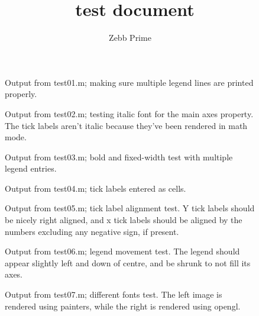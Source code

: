\documentclass[a4paper,11pt]{article}
\title{\matlabfrag\ test document}
\author{Zebb Prime}
\begin{document}
  \maketitle
     \begin{figure}[ht]
       \centering
       \caption{Output from {\ttfamily test01.m}; making sure multiple legend lines are printed properly.}
     \end{figure}
     \begin{figure}[ht]
       \centering
       \caption{Output from {\ttfamily test02.m}; testing italic font for the main axes property. The
       tick labels aren't italic because they've been rendered in math mode.}
     \end{figure}
     \begin{figure}[ht]
       \centering
       \caption{Output from {\ttfamily test03.m}; bold and fixed-width test with multiple legend entries.}
     \end{figure}
     \begin{figure}[ht]
       \centering
       \caption{Output from {\ttfamily test04.m}; tick labels entered as cells.}
     \end{figure}
     \begin{figure}[ht]
       \centering
       \caption{Output from {\ttfamily test05.m}; tick label alignment test. Y tick labels should be
       nicely right aligned, and x tick labels should be aligned by the numbers excluding any negative
       sign, if present.}
%
\clearpage
%
     \end{figure}
     \begin{figure}[ht]
       \centering
       \caption{Output from {\ttfamily test06.m}; legend movement test. The legend should appear slightly
         left and down of centre, and be shrunk to not fill its axes.}
     \end{figure}
     \begin{figure}[ht]
       \centering
       \quad
       \caption{Output from {\ttfamily test07.m}; different fonts test. The left image is rendered using
       painters, while the right is rendered using opengl.}
     \end{figure}
\end{document}
